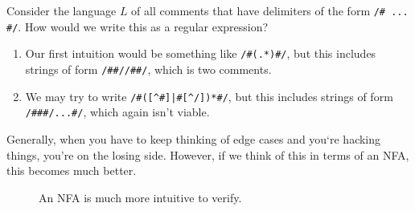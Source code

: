   \begin{example}
    Consider the language $L$ of all comments that have delimiters of the form \texttt{/\# ... \#/}. How would we write this as a regular expression? 
    \begin{enumerate}
      \item Our first intuition would be something like \texttt{/\#(.*)\#/}, but this includes strings of form \texttt{/\#\#//\#\#/}, which is two comments. 
      \item We may try to write \texttt{/\#([\^{}\#]|\#[\^{}/])*\#/}, but this includes strings of form \texttt{/\#\#\#/...\#/}, which again isn't viable. 
    \end{enumerate}
    Generally, when you have to keep thinking of edge cases and you`re hacking things, you're on the losing side. However, if we think of this in terms of an NFA, this becomes much better. 

    \begin{figure}[H]
      \centering
      \caption{An NFA is much more intuitive to verify.}
      \label{fig:nfa_original_texttt}
    \end{figure}
  \end{example}

